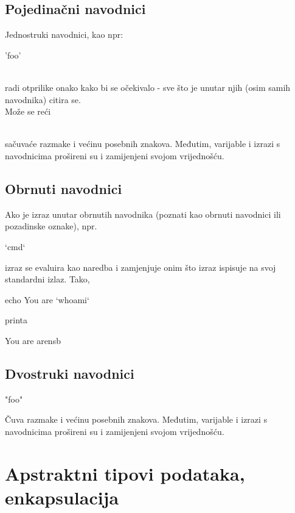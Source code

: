\documentclass[11pt]{book}
\begin{document}
\subsection{Pojedinačni navodnici}
Jednostruki navodnici, kao npr: 
\begin{shortlisting}
'foo'
\end{shortlisting}\\
radi otprilike onako kako bi se očekivalo - sve što je unutar njih (osim samih navodnika) citira se. \\
Može se reći
\\
sačuvaće razmake i većinu posebnih znakova. Međutim, varijable i izrazi s navodnicima prošireni su i zamijenjeni svojom vrijednošću.

\subsection{Obrnuti navodnici}
Ako je izraz unutar obrnutih navodnika (poznati kao obrnuti navodnici ili pozadinske oznake), npr.
\begin{shortlisting}
`cmd`
\end{shortlisting}
izraz se evaluira kao naredba i zamjenjuje onim što izraz ispisuje na svoj standardni izlaz. Tako,
\begin{shortlisting}
echo You are `whoami`
\end{shortlisting}
printa
\begin{shortlisting}
You are arensb
\end{shortlisting}

\subsection{Dvostruki navodnici}
\begin{shortlisting}
"foo"
\end{shortlisting}
Čuva razmake i većinu posebnih znakova. Međutim, varijable i izrazi s navodnicima prošireni su i zamijenjeni svojom vrijednošću.


\section{Apstraktni tipovi podataka, enkapsulacija}
\end{document}
